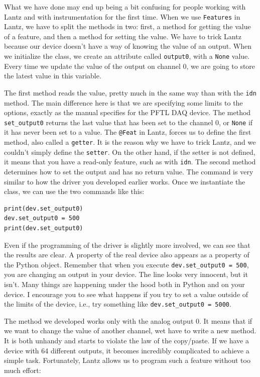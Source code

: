 What we have done may end up being a bit confusing for people working with Lantz and with instrumentation for the first time. When we use \texttt{Features} in Lantz, we have to split the methods in two: first, a method for getting the value of a feature, and then a method for setting the value. We have to trick Lantz because our device doesn't have a way of knowing the value of an output. When we initialize the class, we create an attribute called \texttt{output0}, with a \texttt{None} value. Every time we update the value of the output on channel 0, we are going to store the latest value in this variable.

The first method reads the value, pretty much in the same way than with the \texttt{idn} method. The main difference here is that we are specifying some limits to the options, exactly as the manual specifies for the {PFTL DAQ} device. The method \texttt{set\_output0} returns the last value that has been set to the channel 0, or \texttt{None} if it has never been set to a value. The \texttt{@Feat} in Lantz, forces us to define the first method, also called a \texttt{getter}. It is the reason why we have to trick Lantz, and we couldn't simply define the \texttt{setter}. On the other hand, if the setter is not defined, it means that you have a read-only feature, such as with \texttt{idn}. The second method determines how to set the output and has no return value. The command is very similar to how the driver you developed earlier works. Once we instantiate the class, we can use the two commands like this:

\begin{verbatim}
print(dev.set_output0)
dev.set_output0 = 500
print(dev.set_output0)
\end{verbatim}

Even if the programming of the driver is slightly more involved, we can see that the results are clear. A property of the real device also appears as a property of the Python object. Remember that when you execute \texttt{dev.set\_output0 = 500}, you are changing an output in your device. The line looks very innocent, but it isn't. Many things are happening under the hood both in Python and on your device. I encourage you to see what happens if you try to set a value outside of the limits of the device, i.e., try something like \texttt{dev.set\_output0 = 5000}.

The method we developed works only with the analog output 0. It means that if we want to change the value of another channel, wet have to write a new method. It is both unhandy and starts to violate the law of the copy/paste. If we have a device with 64 different outputs, it becomes incredibly complicated to achieve a simple task. Fortunately, Lantz allows us to program such a feature without too much effort:


